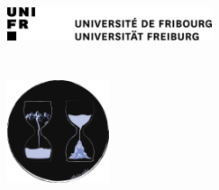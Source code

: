 \begin{titlepage}
	\tgherosfont
	\centering

	\includegraphics[width=6cm]{figs/unifr-logo} \\[2mm]
	\textsf{\thesisUniversityDepartment} \\
	\textsf{\thesisUniversityGroup} \\

	\vfill
	\includegraphics[width=3cm]{figs/air_logo_circle} \\[2mm]
	{\LARGE \color{ctcolortitle}\textbf{\thesisTitle} \\[10mm]}
	{\Large \thesisName} \\


\end{titlepage}
